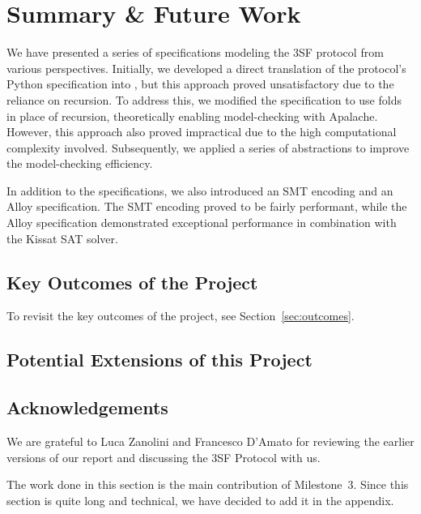 \documentclass[12pt]{article}
\begin{document}
\section{Summary \& Future Work}\label{sec:summary}
We have presented a series of specifications modeling the 3SF protocol from
various perspectives. Initially, we developed a direct translation of the
protocol's Python specification into \tlap{}, but this approach proved
unsatisfactory due to the reliance on recursion. To address this, we modified
the specification to use folds in place of recursion, theoretically enabling
model-checking with Apalache. However, this approach also proved impractical
due to the high computational complexity involved. Subsequently, we applied a
series of abstractions to improve the model-checking efficiency.

In addition to the \tlap{} specifications, we also introduced an SMT encoding
and an Alloy specification. The SMT encoding proved to be fairly performant,
while the Alloy specification demonstrated exceptional performance in
combination with the Kissat SAT solver.

\subsection{Key Outcomes of the Project}

To revisit the key outcomes of the project, see Section~\ref{sec:outcomes}.

\subsection{Potential Extensions of this Project}\label{sec:future}



\subsection*{Acknowledgements}

We are grateful to Luca Zanolini and Francesco D'Amato for reviewing the earlier
versions of our report and discussing the 3SF Protocol with us.


\pagebreak



\pagebreak

\appendix

The work done in this section is the main contribution of Milestone~3. Since
this section is quite long and technical, we have decided to add it in the
appendix.




\end{document}
